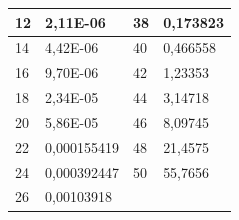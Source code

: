 \documentclass[11pt,openany]{book}
\begin{document}
\begin{figure}[H]
\begin{minipage}{0.5\textwidth}
\begin{tabular}{|l|l|l|l|}
        12 & 2,11E-06 & 38 & 0,173823 \\ \hline
        14 & 4,42E-06 & 40 & 0,466558 \\ \hline
        16 & 9,70E-06 & 42 & 1,23353 \\ \hline
        18 & 2,34E-05 & 44 & 3,14718 \\ \hline
        20 & 5,86E-05 & 46 & 8,09745 \\ \hline
        22 & 0,000155419 & 48 & 21,4575 \\ \hline
        24 & 0,000392447 & 50 & 55,7656 \\ \hline
        26 & 0,00103918 & ~ & \\ \hline
        \end{tabular}
    \end{minipage}
\end{figure}
\end{document}
